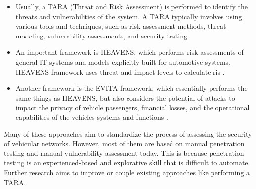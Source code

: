 \begin{itemize}

\item Usually, a TARA (Threat and Risk Assessment) \cite{tara} is performed to identify the threats and vulnerabilities of the system. A TARA typically involves using various tools and techniques, such as risk assessment methods, threat modeling, vulnerability assessments, and security testing.

\item An important framework is HEAVENS, which performs risk assessments of general IT systems and models explicitly built for automotive systems. HEAVENS framework uses threat and impact levels to calculate ris \cite{heavens}.

\item Another framework is the EVITA framework, which essentially performs the same things as HEAVENS, but also considers the potential of attacks to impact the privacy of vehicle passengers, financial losses, and the operational capabilities of the vehicles systems and functions \cite{evita}.\\

\end{itemize}



Many of these approaches aim to standardize the process of assessing the security of vehicular networks. However, most of them are based on manual penetration testing and manual vulnerability assessment today. This is because penetration testing is an experienced-based and explorative skill that is difficult to automate. Further research aims to improve or couple existing approaches like performing a TARA. 

